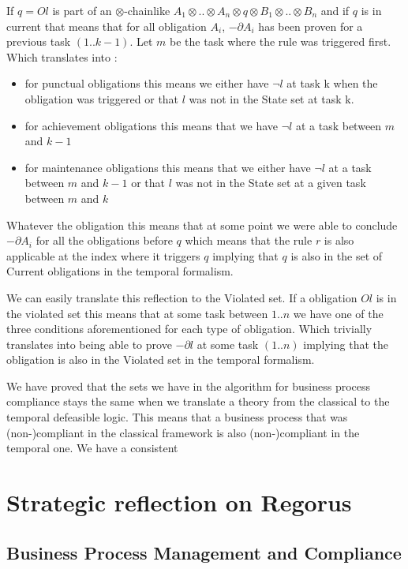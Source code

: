 \documentclass[10pt]{report}
\newcommand{\ochain}{$\otimes$-chain}
\begin{document}
If $q=Ol$ is part of an \ochain like $A_{1}\otimes .. \otimes A_{n} \otimes q \otimes B_{1} \otimes .. \otimes B_{n}$ and if $q$ is in current that means that for all obligation $A_{i}$, $-\partial A_{i}$ has been proven for a previous task $(1..k-1)$. Let $m$ be the task where the rule was triggered first. Which translates into :
\begin{itemize}
\item for punctual obligations this means we either have $\neg l$ at task k when the obligation was triggered or that $l$ was not in the State set at task k.
\item for achievement obligations this means that we have $\neg l$ at a task between $m$ and $k-1$
\item for maintenance obligations this means that we either have $\neg l$ at a task between $m$ and $k-1$ or that $l$ was not in the State set at a given task between $m$ and $k$ 
\end{itemize}

Whatever the obligation this means that at some point we were able to conclude $-\partial A_{i}$ for all the obligations before $q$ which means that the rule $r$ is also applicable at the index where it triggers $q$ implying that $q$ is also in the set of Current obligations in the temporal formalism.

We can easily translate this reflection to the Violated set. If a obligation $Ol$ is in the violated set this means that at some task between $1..n$ we have one of the three conditions aforementioned for each type of obligation. Which trivially translates into being able to prove $-\partial l$ at some task $(1..n)$ implying that the obligation is also in the Violated set in the temporal formalism.

We have proved that the sets we have in the algorithm for business process compliance stays the same when we translate a theory from the classical to the temporal defeasible logic. This means that a business process that was (non-)compliant in the classical framework is also (non-)compliant in the temporal one. We have a consistent 

\newpage
\chapter{ Strategic reflection on Regorus}

\section{Business Process Management and Compliance}
\end{document}
